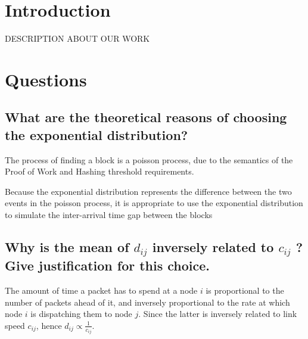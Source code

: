 \documentclass[a4paper,14pt]{article}
\begin{document}

\date{Spring 2023}
\maketitle

\justifying


\justifying

\section*{Introduction}

DESCRIPTION ABOUT OUR WORK

\section{Questions}

\subsection{ What are the theoretical reasons of choosing the exponential distribution?}

The process of finding a block is a poisson process, due to the semantics of the Proof of Work and Hashing threshold requirements.

Because the exponential distribution represents the difference between the two events in the poisson process, it is appropriate to use the exponential distribution to simulate the inter-arrival time gap between the blocks

\subsection{ Why is the mean of $d_{ij}$ inversely related to $c_{ij}$ ? Give justification for this choice.}

The amount of time a packet has to spend at a node $i$ is proportional to the number of packets ahead of it, and inversely proportional to the rate at which node $i$ is dispatching them to node $j$.
Since the latter is inversely related to link speed $c_{ij}$, hence $d_{ij} \propto \frac{1}{c_{ij}}$.
\end{document}
